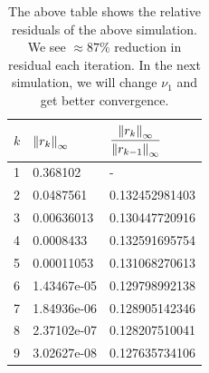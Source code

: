 \documentclass{article} %
\theoremstyle{plain}
\numberwithin{equation}{section} %
\numberwithin{figure}{section} %
\numberwithin{table}{section} %
\begin{document}
\begin{table}[ht!]
    \centering
    \begin{tabular}{||l|l|l||}
        \hline\hline
        $k$ & $\norm{r_k}_\infty$ & $\dfrac{\vphantom{\frac{1}{1}}\norm{r_k}_\infty}{\vphantom{\frac{1}{1}}\norm{r_{k-1}}_\infty}$   \\
        \hline\hline
        1 & 0.368102 & - \\\hline
        2 & 0.0487561 & 0.132452981403 \\\hline
        3 & 0.00636013 & 0.130447720916 \\\hline
        4 & 0.0008433 & 0.132591695754 \\\hline
        5 & 0.00011053 & 0.131068270613 \\\hline
        6 & 1.43467e-05 & 0.129798992138 \\\hline
        7 & 1.84936e-06 & 0.128905142346 \\\hline
        8 & 2.37102e-07 & 0.128207510041 \\\hline
        9 & 3.02627e-08 & 0.127635734106 \\
        \hline\hline
    \end{tabular}
    \caption*{The above table shows the relative residuals of the above simulation.  We see $\approx87\%$ reduction in residual each iteration.  In the next simulation, we will change $\nu_1$ and get better convergence.}
\end{table}
\FloatBarrier
\end{document}
